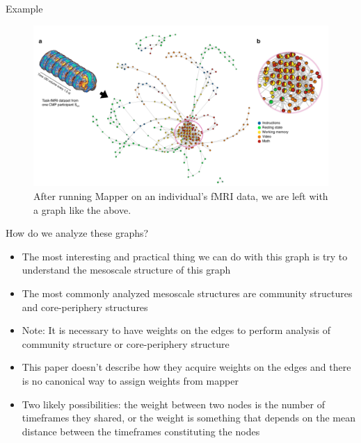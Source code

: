 \documentclass{beamer}
\begin{document}
\begin{frame}{Example}
    \begin{figure}
        \includegraphics[width = 0.85\linewidth]{fig2.png}
        \caption{After running Mapper on an individual's fMRI data, we are left with a graph like the above. }
    \end{figure}
\end{frame}

\begin{frame}{How do we analyze these graphs?}
    \begin{itemize}
        \item The most interesting and practical thing we can do with this graph is try to understand the mesoscale structure of this graph \pause
        \item The most commonly analyzed mesoscale structures are community structures and core-periphery structures \pause
        \item Note: It is necessary to have weights on the edges to perform analysis of community structure or core-periphery structure
        \item This paper doesn't describe how they acquire weights on the edges and there is no canonical way to assign weights from mapper \pause
        \item Two likely possibilities: the weight between two nodes is the number of timeframes they shared, or the weight is something that depends on the mean distance between the timeframes constituting the nodes
    \end{itemize}
\end{frame}
\end{document}
